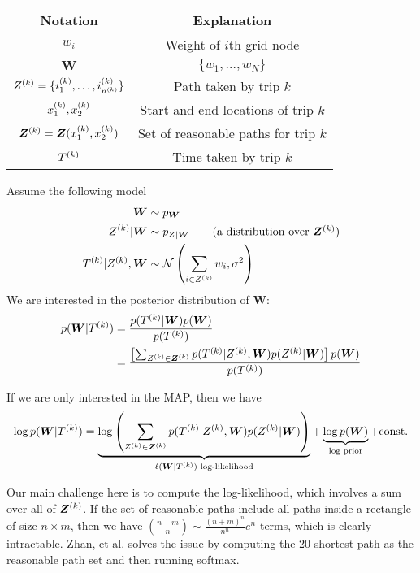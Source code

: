 \documentclass[12pt]{article}
\begin{document}
\begin{center}
\begin{tabular}{cc}\toprule
    Notation & Explanation \\
    \midrule
    $w_i$ & Weight of $i$th grid node \\
    $\bm W$ & $\{w_1,\ldots, w_N\}$ \\
    $Z^{(k)} = \{i_1^{(k)}, \ldots, i_{n^{(k)}}^{(k)}\}$ & Path taken by trip $k$ \\
    $x_1^{(k)}, x_2^{(k)}$ & Start and end locations of trip $k$\\
    $\bm Z^{(k)} = \bm Z(x_1^{(k)},x_2^{(k)})$ & Set of reasonable paths for trip $k$\\
    $T^{(k)}$ & Time taken by trip $k$ \\\bottomrule
\end{tabular}
\end{center}

Assume the following model \begin{align*}
\bm W &\sim p_{\bm W} \\
Z\uppr{k} | \bm W &\sim p_{Z | \bm W} \tag{a distribution over $\bm Z\uppr{k}$}\\
T\uppr{k} | Z\uppr{k}, \bm W &\sim \Norm\pr{\sum_{i\in Z\uppr{k}} w_i, \sigma^2}
\end{align*}
We are interested in the posterior distribution of $\bm W$: 
\begin{align*}
p(\bm W | T^{(k)}) &= \frac{p(T^{(k)}| \bm W) p(\bm W)}{p(T^{(k)})} \\
&=\frac{\left[{\sum_{Z^{(k)} \in \bm Z^{(k)}} p(T^{(k)}|Z^{(k)}, \bm W) p(Z^{(k)}| \bm W)}\right] p(\bm W)}{p(T^{(k)})}
\end{align*}

If we are only interested in the MAP, then we have \[
\log p(\bm W | T^{(k)}) = \underbrace{\log \left({\sum_{Z^{(k)} \in \bm Z^{(k)}} p(T^{(k)}|Z^{(k)}, \bm W) p(Z^{(k)}| \bm W)}\right)}_{\ell(\bm W | T^{(k)}) \text{ log-likelihood}} + \underbrace{\log p(\bm W)}_{\text{log prior}} + \text{const.}
\]

Our main challenge here is to compute the log-likelihood, which involves a sum over all of $\bm Z^{(k)}$. If the set of reasonable paths include all paths inside a rectangle of size $n \times m$, then we have $\binom{n+m}{n} \sim \frac{(n+m)^n}{n^n}e^{n}$ terms, which is clearly intractable. Zhan, et al. solves the issue by computing the 20 shortest path as the reasonable path set and then running softmax.
\end{document}
